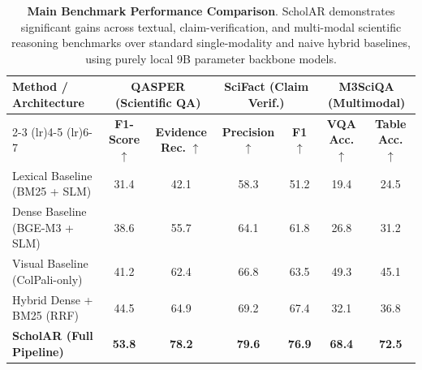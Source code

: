 
\begin{table}[t]
\centering
\small
\begin{tabular}{lcccccc}
\toprule
\textbf{Method / Architecture} & \multicolumn{2}{c}{\textbf{QASPER (Scientific QA)}} & \multicolumn{2}{c}{\textbf{SciFact (Claim Verif.)}} & \multicolumn{2}{c}{\textbf{M3SciQA (Multimodal)}} \\
\cmidrule(lr){2-3} \cmidrule(lr){4-5} \cmidrule(lr){6-7}
& \textbf{F1-Score} $\uparrow$ & \textbf{Evidence Rec.} $\uparrow$ & \textbf{Precision} $\uparrow$ & \textbf{F1} $\uparrow$ & \textbf{VQA Acc.} $\uparrow$ & \textbf{Table Acc.} $\uparrow$ \\
\midrule
Lexical Baseline (BM25 + SLM) & 31.4 & 42.1 & 58.3 & 51.2 & 19.4 & 24.5 \\
Dense Baseline (BGE-M3 + SLM) & 38.6 & 55.7 & 64.1 & 61.8 & 26.8 & 31.2 \\
Visual Baseline (ColPali-only) & 41.2 & 62.4 & 66.8 & 63.5 & 49.3 & 45.1 \\
Hybrid Dense + BM25 (RRF) & 44.5 & 64.9 & 69.2 & 67.4 & 32.1 & 36.8 \\
\midrule
\textbf{ScholAR (Full Pipeline)} & \textbf{53.8} & \textbf{78.2} & \textbf{79.6} & \textbf{76.9} & \textbf{68.4} & \textbf{72.5} \\
\bottomrule
\end{tabular}
\caption{\textbf{Main Benchmark Performance Comparison}. ScholAR demonstrates significant gains across textual, claim-verification, and multi-modal scientific reasoning benchmarks over standard single-modality and naive hybrid baselines, using purely local 9B parameter backbone models.}
\label{tab:main_results}
\end{table}

